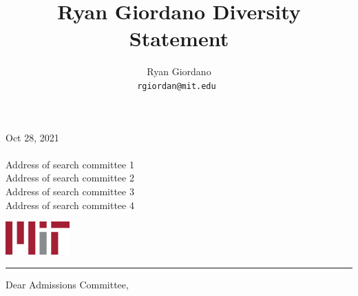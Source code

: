 
\usepackage{enumitem}

\usepackage{geometry}
\geometry{top=1.3in}
\geometry{left=1.0in}
\geometry{right=1.0in}



\title{Ryan Giordano Diversity Statement}



\def\date{Oct 28, 2021}

\def\whom{Admissions Committee}

\def\address{
Address of search committee 1\\
Address of search committee 2\\
Address of search committee 3\\
Address of search committee 4\\
}

\def\position{Assistant Professor in the Department of Statistics}

\def\deptspecific{
Your department looks particularly amazing.
}




\author{
  Ryan Giordano \\ \texttt{rgiordan@mit.edu }
}



\begin{minipage}[t]{0.5\textwidth}
    \vspace{-3.5em} %
    \date \\ \\
    \address
\end{minipage}
\begin{minipage}[t]{0.5\textwidth}
    \hspace{2in} \includegraphics[height=0.5in]{static_images/1280px-MIT_logo.svg.png}
\end{minipage}

\textcolor{mitred}{\rule{16cm}{1mm}}

\vspace{3em}
Dear \whom,

